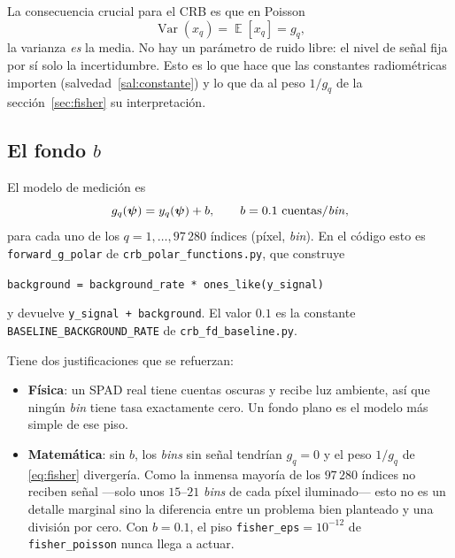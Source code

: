 \documentclass[11pt,a4paper]{article}
\newcommand{\vect}[1]{\boldsymbol{#1}}
\newcommand{\code}[1]{\texttt{#1}}
\DeclareMathOperator*{\E}{\mathbb{E}}
\theoremstyle{definition}
\theoremstyle{plain}
\begin{document}
La consecuencia crucial para el CRB es que en Poisson
%
\begin{equation}
\label{eq:poisson-var}
\operatorname{Var}(x_q) = \E[x_q] = g_q ,
\end{equation}
%
la varianza \emph{es} la media. No hay un parámetro de ruido libre: el nivel de
señal fija por sí solo la incertidumbre. Esto es lo que hace que las constantes
radiométricas importen (salvedad~\ref{sal:constante}) y lo que da al peso
$1/g_q$ de la sección~\ref{sec:fisher} su interpretación.

\subsection{El fondo \texorpdfstring{$b$}{b}}

El modelo de medición es
%
\begin{equation}
\label{eq:g}
g_q(\vect\psi) = y_q(\vect\psi) + b,
\qquad b = 0.1\ \text{cuentas/\emph{bin}},
\end{equation}
%
para cada uno de los $q=1,\dots,97\,280$ índices (píxel, \emph{bin}). En el
código esto es \code{forward\_g\_polar} de \code{crb\_polar\_functions.py}, que
construye
%
\begin{center}
\code{background = background\_rate * ones\_like(y\_signal)}
\end{center}
%
y devuelve \code{y\_signal + background}. El valor $0.1$ es la constante
\code{BASELINE\_BACKGROUND\_RATE} de \code{crb\_fd\_baseline.py}.

Tiene dos justificaciones que se refuerzan:

\begin{itemize}[leftmargin=*]
  \item \textbf{Física}: un SPAD real tiene cuentas oscuras y recibe luz
        ambiente, así que ningún \emph{bin} tiene tasa exactamente cero. Un
        fondo plano es el modelo más simple de ese piso.
  \item \textbf{Matemática}: sin $b$, los \emph{bins} sin señal tendrían
        $g_q=0$ y el peso $1/g_q$ de \eqref{eq:fisher} divergería. Como la
        inmensa mayoría de los $97\,280$ índices no reciben señal ---solo unos
        $15$--$21$ \emph{bins} de cada píxel iluminado--- esto no es un detalle
        marginal sino la diferencia entre un problema bien planteado y una
        división por cero. Con $b=0.1$, el piso \code{fisher\_eps}$=10^{-12}$
        de \code{fisher\_poisson} nunca llega a actuar.
\end{itemize}
\end{document}
